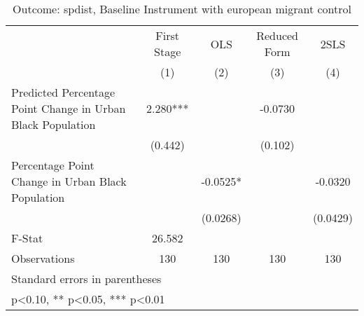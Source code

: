 \begin{table}[htbp]\centering
\def\sym#1{\ifmmode^{#1}\else\(^{#1}\)\fi}
\caption{Outcome: spdist, Baseline Instrument with european migrant control}
\begin{tabular}{l*{4}{c}}
\toprule
                    & First Stage   &         OLS   &Reduced Form   &        2SLS   \\
                    &\multicolumn{1}{c}{(1)}   &\multicolumn{1}{c}{(2)}   &\multicolumn{1}{c}{(3)}   &\multicolumn{1}{c}{(4)}   \\
\midrule
Predicted Percentage Point Change in Urban Black Population&       2.280***&               &     -0.0730   &               \\
                    &     (0.442)   &               &     (0.102)   &               \\
\addlinespace
Percentage Point Change in Urban Black Population&               &     -0.0525*  &               &     -0.0320   \\
                    &               &    (0.0268)   &               &    (0.0429)   \\
\midrule
F-Stat              &      26.582   &               &               &               \\
Observations        &         130   &         130   &         130   &         130   \\
\bottomrule
\multicolumn{5}{l}{\footnotesize Standard errors in parentheses}\\
\multicolumn{5}{l}{\footnotesize * p<0.10, ** p<0.05, *** p<0.01}\\
\end{tabular}
\end{table}

